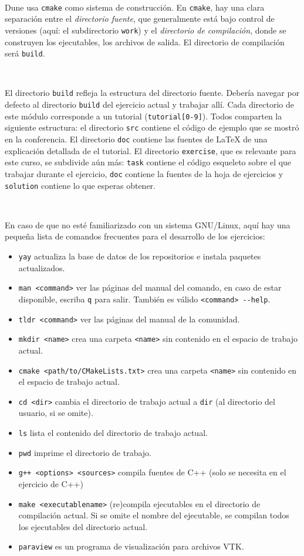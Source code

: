 \documentclass[9pt,a3paper]{scrartcl}
\begin{document}
\

Dune usa \verb!cmake! como sistema de construcción.
En \verb!cmake!, hay una clara separación entre el \textit{directorio fuente}, que
generalmente está bajo control de versiones (aquí: el subdirectorio \verb!work!) y el \textit{directorio de compilación}, donde se construyen los ejecutables, los archivos de salida. El directorio de compilación será \verb!build!.

\

El directorio \verb!build! refleja la estructura del directorio fuente.
Debería navegar por defecto al directorio \verb!build! del ejercicio actual y trabajar allí.
Cada directorio de este módulo corresponde a un tutorial (\verb!tutorial[0-9]!).
Todos comparten la siguiente estructura: el directorio \verb!src! contiene el
código de ejemplo que se mostró en la conferencia.
El directorio \verb!doc! contiene las fuentes de \LaTeX{} de una explicación detallada de
el tutorial.
El directorio \verb!exercise!, que es relevante para este curso, se subdivide aún más: \verb!task! contiene el código esqueleto sobre el que trabajar durante el ejercicio, \verb!doc! contiene la fuentes de la hoja de ejercicios y \verb!solution! contiene lo que esperas obtener.

\

En caso de que no esté familiarizado con un sistema GNU/Linux, aquí hay una pequeña lista de comandos frecuentes para el desarrollo de los ejercicios:
\begin{itemize}
	\item
	      \verb!yay! actualiza la base de datos de los repositorios e instala paquetes actualizados.

	\item
	      \verb!man <command>! ver las páginas del manual del comando, en caso de estar disponible, escriba \verb!q! para salir. También es válido \verb!<command> --help!.
	\item
	      \verb!tldr <command>! ver las páginas del manual de la comunidad.
	\item
	      \verb!mkdir <name>! crea una carpeta \verb!<name>! sin contenido en el espacio de trabajo actual.
	\item
	      \verb!cmake <path/to/CMakeLists.txt>! crea una carpeta \verb!<name>! sin contenido en el espacio de trabajo actual.
	\item
	      \verb!cd <dir>! cambia el directorio de trabajo actual
	      a \verb!dir! (al directorio del usuario, si se omite).
	\item
	      \verb!ls! lista el contenido del directorio de trabajo actual.
	\item
	      \verb!pwd! imprime el directorio de trabajo.
	\item
	      \verb!g++ <options> <sources>! compila fuentes de C++ (solo se necesita en el ejercicio de C++)
	\item
	      \verb!make <executablename>! (re)compila ejecutables en el directorio de compilación actual. Si se omite el nombre del ejecutable, se compilan todos los ejecutables del directorio actual.
	\item
	      \verb!paraview! es un programa de visualización para archivos VTK.
\end{itemize}
\end{document}
